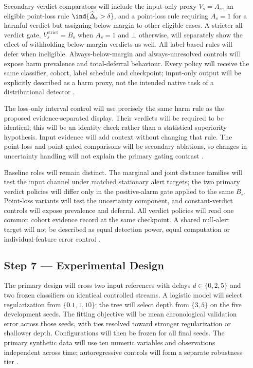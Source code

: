 Secondary verdict comparators will include the input-only proxy $V_s=A_s$, an eligible point-loss rule $\ind\{\widehat\Delta_s>\delta\}$, and a point-loss rule requiring $A_s=1$ for a harmful verdict but assigning below-margin to other eligible cases. A stricter all-verdict gate, $V_s^{\mathrm{strict}}=B_s$ when $A_s=1$ and $\bot$ otherwise, will separately show the effect of withholding below-margin verdicts as well. All label-based rules will defer when ineligible. Always-below-margin and always-unresolved controls will expose harm prevalence and total-deferral behaviour. Every policy will receive the same classifier, cohort, label schedule and checkpoint; input-only output will be explicitly described as a harm proxy, not the intended native task of a distributional detector \cite{alencar,solozobov}.

The loss-only interval control will use precisely the same harm rule as the proposed evidence-separated display. Their verdicts will be required to be identical; this will be an identity check rather than a statistical superiority hypothesis. Input evidence will add context without changing that rule. The point-loss and point-gated comparisons will be secondary ablations, so changes in uncertainty handling will not explain the primary gating contrast \cite{solozobov}.

Baseline roles will remain distinct. The marginal and joint distance families will test the input channel under matched stationary alert targets; the two primary verdict policies will differ only in the positive-alarm gate applied to the same $B_s$. Point-loss variants will test the uncertainty component, and constant-verdict controls will expose prevalence and deferral. All verdict policies will read one common cohort evidence record at the same checkpoint. A shared null-alert target will not be described as equal detection power, equal computation or individual-feature error control \cite{cerqueira,selective}.

\subsection*{Step 7 --- Experimental Design}
The primary design will cross two input references with delays $d\in\{0,2,5\}$ and two frozen classifiers on identical controlled streams. A logistic model will select regularization from $\{0.1,1,10\}$; the tree will select depth from $\{3,5\}$ on the five development seeds. The fitting objective will be mean chronological validation error across those seeds, with ties resolved toward stronger regularization or shallower depth. Configurations will then be frozen for all final seeds. The primary synthetic data will use ten numeric variables and observations independent across time; autoregressive controls will form a separate robustness tier \cite{souza,cerqueira}.

